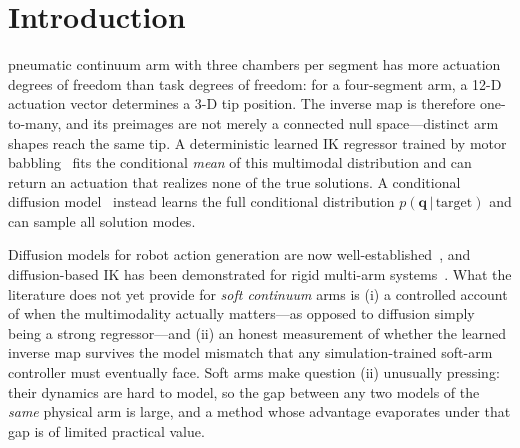 \section{Introduction}

 pneumatic continuum arm with three chambers
per segment has more actuation degrees of freedom than task degrees of
freedom: for a four-segment arm, a 12-D actuation vector determines a 3-D tip
position. The inverse map is therefore one-to-many, and its preimages are not
merely a connected null space---distinct arm shapes reach the same tip. A
deterministic learned IK regressor trained by motor
babbling~\cite{giorelli2015neural} fits the conditional \emph{mean} of this
multimodal distribution and can return an actuation that realizes none of the
true solutions. A conditional diffusion
model~\cite{ho2020denoising,song2021denoising} instead learns the full
conditional distribution $p(\mathbf{q}\,|\,\text{target})$ and can sample all
solution modes.

Diffusion models for robot action generation are now
well-established~\cite{chi2023diffusion}, and diffusion-based IK has been
demonstrated for rigid multi-arm systems~\cite{zhang2025ikdiffuser}. What the
literature does not yet provide for \emph{soft continuum} arms is (i) a
controlled account of when the multimodality actually matters---as opposed to
diffusion simply being a strong regressor---and (ii) an honest measurement of
whether the learned inverse map survives the model mismatch that any
simulation-trained soft-arm controller must eventually face. Soft arms make
question (ii) unusually pressing: their dynamics are hard to model, so the
gap between any two models of the \emph{same} physical arm is large, and a
method whose advantage evaporates under that gap is of limited practical
value.

